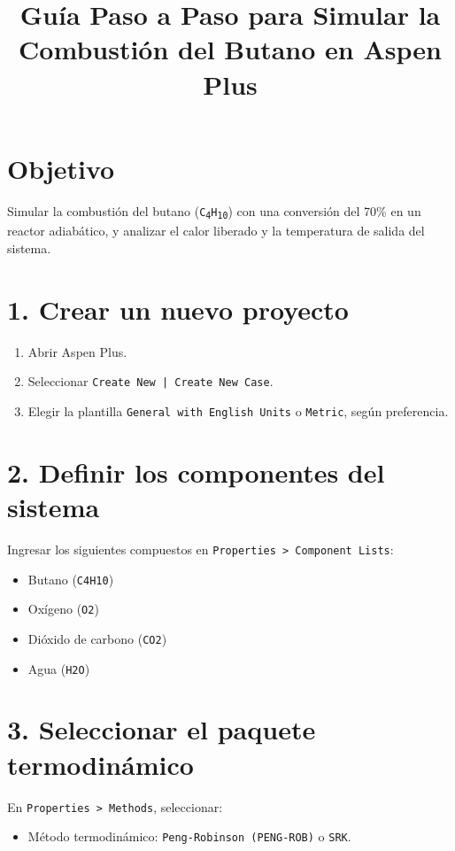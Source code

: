 \documentclass[12pt]{article}
\title{Guía Paso a Paso para Simular la Combustión del Butano en Aspen Plus}
\author{}
\date{}
\begin{document}
\maketitle

\section*{Objetivo}
Simular la combustión del butano (\texttt{C\textsubscript{4}H\textsubscript{10}}) con una conversión del 70\% en un reactor adiabático, y analizar el calor liberado y la temperatura de salida del sistema.

\begin{center}
\end{center}

\vspace{1em}

\section*{1. Crear un nuevo proyecto}
\begin{enumerate}
  \item Abrir Aspen Plus.
  \item Seleccionar \texttt{Create New | Create New Case}.
  \item Elegir la plantilla \texttt{General with English Units} o \texttt{Metric}, según preferencia.
\end{enumerate}

\section*{2. Definir los componentes del sistema}
Ingresar los siguientes compuestos en \texttt{Properties > Component Lists}:
\begin{itemize}
  \item Butano (\texttt{C4H10})
  \item Oxígeno (\texttt{O2})
  \item Dióxido de carbono (\texttt{CO2})
  \item Agua (\texttt{H2O})
\end{itemize}

\section*{3. Seleccionar el paquete termodinámico}
En \texttt{Properties > Methods}, seleccionar:
\begin{itemize}
  \item Método termodinámico: \texttt{Peng-Robinson (PENG-ROB)} o \texttt{SRK}.
\end{itemize}
\end{document}
